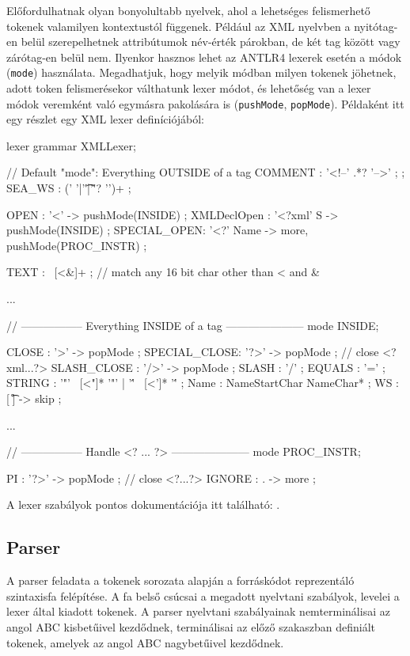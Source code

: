 \documentclass[12pt, a4paper]{report}
\newcommand{\f}[1]{\texttt{#1}}
\begin{document}
Előfordulhatnak olyan bonyolultabb nyelvek, ahol a lehetséges felismerhető tokenek valamilyen kontextustól függenek. Például az XML nyelvben a nyitótag-en belül szerepelhetnek attribútumok név-érték párokban, de két tag között vagy zárótag-en belül nem. Ilyenkor hasznos lehet az ANTLR4 lexerek esetén a módok (\f{mode}) használata. Megadhatjuk, hogy melyik módban milyen tokenek jöhetnek, adott token felismerésekor válthatunk lexer módot, és lehetőség van a lexer módok veremként való egymásra pakolására is (\f{pushMode}, \f{popMode}). Példaként itt egy részlet egy XML lexer definíciójából:

\begin{antlr4code}
lexer grammar XMLLexer;

// Default "mode": Everything OUTSIDE of a tag
COMMENT     :   '<!--' .*? '-->' ;
			;
SEA_WS      :   (' '|'\t'|'\r'? '\n')+ ;

OPEN        :   '<'                     -> pushMode(INSIDE) ;
XMLDeclOpen :   '<?xml' S               -> pushMode(INSIDE) ;
SPECIAL_OPEN:   '<?' Name               -> more, pushMode(PROC_INSTR) ;

TEXT        :   ~[<&]+ ;        // match any 16 bit char other than < and &

...

// ----------------- Everything INSIDE of a tag ---------------------
mode INSIDE;

CLOSE       :   '>'                     -> popMode ;
SPECIAL_CLOSE:  '?>'                    -> popMode ; // close <?xml...?>
SLASH_CLOSE :   '/>'                    -> popMode ;
SLASH       :   '/' ;
EQUALS      :   '=' ;
STRING      :   '"' ~[<"]* '"'
			|   '\'' ~[<']* '\''
			;
Name        :   NameStartChar NameChar* ;
WS           :   [ \t\r\n]               -> skip ;

...

// ----------------- Handle <? ... ?> ---------------------
mode PROC_INSTR;

PI          :   '?>'                    -> popMode ; // close <?...?>
IGNORE      :   .                       -> more ;
\end{antlr4code}

A lexer szabályok pontos dokumentációja itt található: \cite{Antlr4Lexer}.

\subsection{Parser}

A parser feladata a tokenek sorozata alapján a forráskódot reprezentáló szintaxisfa felépítése. A fa belső csúcsai a megadott nyelvtani szabályok, levelei a lexer által kiadott tokenek. A parser nyelvtani szabályainak nemterminálisai az angol ABC kisbetűivel kezdődnek, terminálisai az előző szakaszban definiált tokenek, amelyek az angol ABC nagybetűivel kezdődnek.
\end{document}
